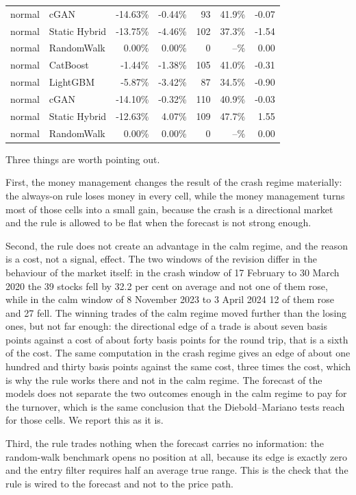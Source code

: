 \documentclass[11pt,a4paper]{article}
\begin{document}
\begin{center}
\begin{longtable}{llrrrrr}
normal & cGAN & -14.63\% & -0.44\% & 93 & 41.9\% & -0.07 \\
normal & Static Hybrid & -13.75\% & -4.46\% & 102 & 37.3\% & -1.54 \\
normal & RandomWalk & 0.00\% & 0.00\% & 0 & --\% & 0.00 \\
normal & CatBoost & -1.44\% & -1.38\% & 105 & 41.0\% & -0.31 \\
normal & LightGBM & -5.87\% & -3.42\% & 87 & 34.5\% & -0.90 \\
normal & cGAN & -14.10\% & -0.32\% & 110 & 40.9\% & -0.03 \\
normal & Static Hybrid & -12.63\% & 4.07\% & 109 & 47.7\% & 1.55 \\
normal & RandomWalk & 0.00\% & 0.00\% & 0 & --\% & 0.00 \\
\bottomrule
\end{longtable}
\end{center}

Three things are worth pointing out.

First, the money management changes the result of the crash regime materially:
the always-on rule loses money in every cell, while the money management turns
most of those cells into a small gain, because the crash is a directional
market and the rule is allowed to be flat when the forecast is not strong
enough.

Second, the rule does not create an advantage in the calm regime, and the
reason is a cost, not a signal, effect. The two windows of the revision
differ in the behaviour of the market itself: in the crash window of 17
February to 30 March 2020 the 39 stocks fell by
32.2 per cent on average and not one of
them rose, while in the calm window of 8 November 2023 to 3 April 2024
12 of them rose and 27 fell.
The winning trades of the calm regime
moved further than the losing ones, but not far enough: the directional edge
of a trade is about seven basis points against a cost of about forty basis
points for the round trip, that is a sixth of the cost. The same computation in
the crash regime gives an edge of about one hundred and thirty basis points
against the same cost, three times the cost, which is why the rule works there
and not in the calm regime. The forecast of the models does not separate the
two outcomes enough in the calm regime to pay for the turnover, which is the
same conclusion that the Diebold--Mariano tests reach for those cells. We
report this as it is.

Third, the rule trades nothing when the forecast carries no information: the
random-walk benchmark opens no position at all, because its edge is exactly
zero and the entry filter requires half an average true range. This is the
check that the rule is wired to the forecast and not to the price path.
\end{document}
